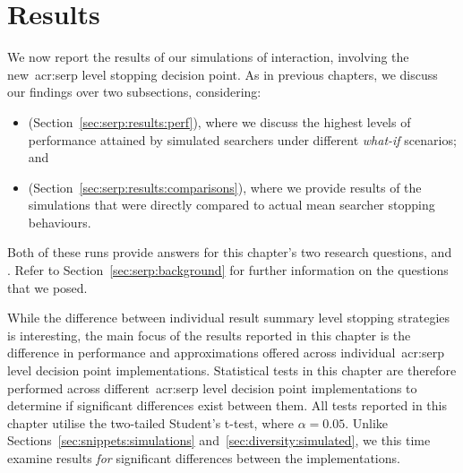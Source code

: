 %

\section{Results}\label{sec:serp:results}
We now report the results of our simulations of interaction, involving the new~\gls{acr:serp} level stopping decision point. As in previous chapters, we discuss our findings over two subsections, considering:

\begin{itemize}
    \item{ (Section~\ref{sec:serp:results:perf}), where we discuss the highest levels of performance attained by simulated searchers under different \emph{what-if} scenarios; and}
    \item{ (Section~\ref{sec:serp:results:comparisons}), where we provide results of the simulations that were directly compared to actual mean searcher stopping behaviours.}
\end{itemize}

Both of these runs provide answers for this chapter's two research questions,  and . Refer to Section~\ref{sec:serp:background} for further information on the questions that we posed.

While the difference between individual result summary level stopping strategies is interesting, the main focus of the results reported in this chapter is the difference in performance and approximations offered across individual~\gls{acr:serp} level decision point implementations. Statistical tests in this chapter are therefore performed across different~\gls{acr:serp} level decision point implementations to determine if significant differences exist between them. All tests reported in this chapter utilise the two-tailed Student's t-test, where $\alpha=0.05$. Unlike Sections~\ref{sec:snippets:simulations} and~\ref{sec:diversity:simulated}, we this time examine results \emph{for} significant differences between the implementations.

